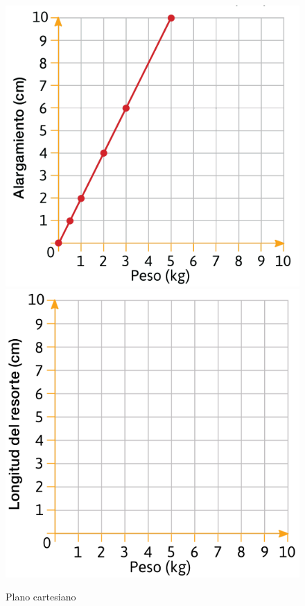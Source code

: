 \begin{multicols}{2}
\begin{parts}
        \begin{figure}[H]
            \centering
            \ifprintanswers
                \includegraphics[width=.7\linewidth]{../images/20230320215503}
            \else
                \includegraphics[width=.7\linewidth]{../images/20230320205645}
            \fi
            \caption{Plano cartesiano}
            \label{fig:20230320205645_a}
        \end{figure}




    \end{parts}
\end{multicols}
